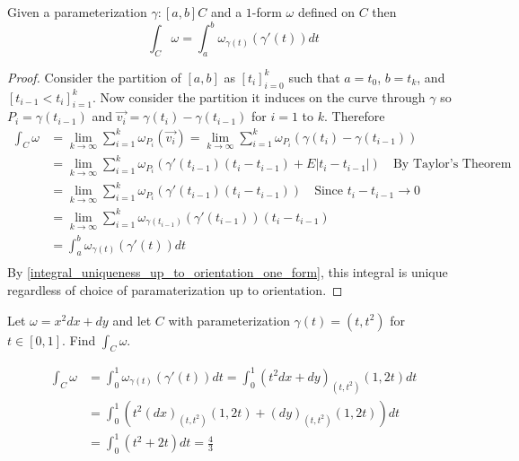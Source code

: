 \documentclass[notes.tex]{subfiles}
\begin{document}
\begin{theorem}
    Given a parameterization $\gamma\colon [a, b] C$ and a $1$-form $\omega$ defined on $C$ then
    \[
        \int_C \omega = \int_a^b \omega_{\gamma(t)}(\gamma'(t))dt
    \]
\end{theorem}
\begin{proof}
    Consider the partition of $[a, b]$ as $[t_i]_{i = 0}^k$ such that $a = t_0$, $b = t_k$, and $[t_{i - 1} < t_i]_{i = 1}^k$. Now consider the partition it induces on the curve through $\gamma$ so $P_i = \gamma(t_{i - 1})$ and $\vec{v_i} = \gamma(t_i) - \gamma(t_{i - 1})$ for $i = 1$ to $k$. Therefore
    \begin{align*}
        \int_C \omega
        &= \lim_{k\to\infty} \sum_{i = 1}^k \omega_{P_i}(\vec{v_i})
        = \lim_{k\to\infty} \sum_{i = 1}^k \omega_{P_i}(\gamma(t_i) - \gamma(t_{i - 1})) \\
        &= \lim_{k\to\infty} \sum_{i = 1}^k \omega_{P_i}(\gamma'(t_{i - 1})(t_i - t_{i -1}) + E|t_i - t_{i - 1}|) \quad \text{By Taylor's Theorem} \\
        &= \lim_{k\to\infty} \sum_{i = 1}^k \omega_{P_i}(\gamma'(t_{i - 1})(t_i - t_{i -1})) \quad \text{Since $t_i - t_{i - 1} \to 0$} \\
        &= \lim_{k\to\infty} \sum_{i = 1}^k \omega_{\gamma(t_{i - 1})}(\gamma'(t_{i - 1}))(t_i - t_{i -1}) \\
        &= \int_a^b \omega_{\gamma(t)}(\gamma'(t))dt \\
    \end{align*}
    By \cref{integral_uniqueness_up_to_orientation_one_form}, this integral is unique regardless of choice of paramaterization up to orientation.
\end{proof}

\begin{exercise}
    Let $\omega = x^2dx + dy$ and let $C$ with parameterization $\gamma(t) = (t, t^2)$ for $t \in [0, 1]$. Find $\int_C \omega$.
\end{exercise}
\begin{solution}
    \begin{align*}
        \int_C \omega
        &= \int_0^1 \omega_{\gamma(t)}(\gamma'(t))dt
        = \int_0^1 (t^2dx + dy)_{(t, t^2)}(1, 2t)dt \\
        &= \int_0^1 (t^2(dx)_{(t, t^2)}(1,2 t) + (dy)_{(t, t^2)}(1, 2t))dt \\
        &= \int_0^1 (t^2 + 2t)dt
        = \frac{4}{3}
    \end{align*}
\end{solution}
\end{document}
